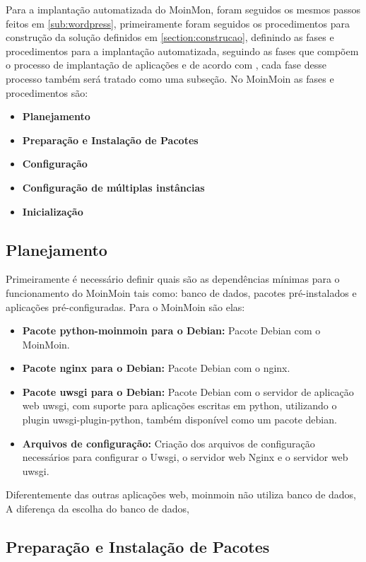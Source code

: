 Para a implantação automatizada do MoinMon, foram seguidos os mesmos passos
feitos em \ref{sub:wordpress}, primeiramente
foram seguidos os procedimentos para construção da solução definidos em \ref{section:construcao},
definindo as fases e procedimentos para a implantação automatizada, seguindo as
fases que compõem o processo de implantação de aplicações e de acordo com \cite{omg2006},
cada fase desse processo também será tratado como uma subseção. No MoinMoin as
fases e procedimentos são:

\begin{itemize}
  \item  \textbf{Planejamento}
  \item  \textbf{Preparação e Instalação de Pacotes}
  \item  \textbf{Configuração}
  \item  \textbf{Configuração de múltiplas instâncias}
  \item  \textbf{Inicialização}
\end{itemize}

\subsection{Planejamento}

Primeiramente é necessário definir quais são as dependências
mínimas para o funcionamento do MoinMoin tais como: banco de dados, pacotes
pré-instalados e aplicações pré-configuradas. Para o MoinMoin são elas:

\begin{itemize}
   \item \textbf{Pacote python-moinmoin para o Debian:} Pacote Debian com o MoinMoin.
   \item \textbf{Pacote nginx para o Debian:} Pacote Debian com o nginx.
   \item \textbf{Pacote uwsgi para o Debian:} Pacote Debian com o servidor de aplicação web
uwsgi, com suporte para aplicações escritas em python, utilizando o plugin uwsgi-plugin-python,
também disponível como um pacote debian.
   \item \textbf{Arquivos de configuração:} Criação dos arquivos de configuração
   necessários para configurar o Uwsgi, o servidor web Nginx e o servidor web
uwsgi.
\end{itemize}

Diferentemente das outras aplicações web, moinmoin não utiliza banco de dados,
A diferença da escolha do banco de dados,
\subsection{Preparação e Instalação de Pacotes}

